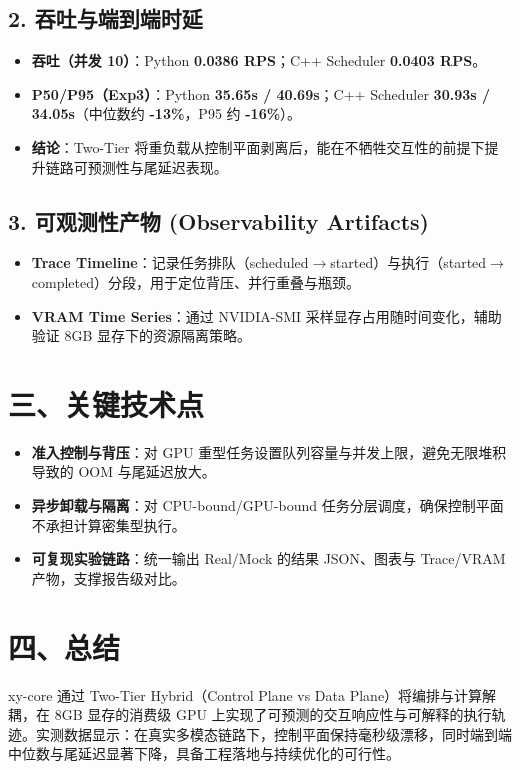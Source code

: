 \documentclass[a4paper,10pt]{ctexart}
\newenvironment{tightitemize}
{ \begin{itemize}
    \setlength{\itemsep}{0pt}
    \setlength{\parskip}{0pt}
    \setlength{\parsep}{0pt}
}
{ \end{itemize} }
\begin{document}
\subsection{2. 吞吐与端到端时延}
\begin{tightitemize}
    \item \textbf{吞吐（并发 10）}：Python \textbf{0.0386 RPS}；C++ Scheduler \textbf{0.0403 RPS}。
    \item \textbf{P50/P95（Exp3）}：Python \textbf{35.65s / 40.69s}；C++ Scheduler \textbf{30.93s / 34.05s}（中位数约 \textbf{-13\%}，P95 约 \textbf{-16\%}）。
    \item \textbf{结论}：Two-Tier 将重负载从控制平面剥离后，能在不牺牲交互性的前提下提升链路可预测性与尾延迟表现。
\end{tightitemize}

\subsection{3. 可观测性产物 (Observability Artifacts)}
\begin{tightitemize}
    \item \textbf{Trace Timeline}：记录任务排队（scheduled$\to$started）与执行（started$\to$completed）分段，用于定位背压、并行重叠与瓶颈。
    \item \textbf{VRAM Time Series}：通过 NVIDIA-SMI 采样显存占用随时间变化，辅助验证 8GB 显存下的资源隔离策略。
\end{tightitemize}

\section{三、关键技术点}
\begin{tightitemize}
    \item \textbf{准入控制与背压}：对 GPU 重型任务设置队列容量与并发上限，避免无限堆积导致的 OOM 与尾延迟放大。
    \item \textbf{异步卸载与隔离}：对 CPU-bound/GPU-bound 任务分层调度，确保控制平面不承担计算密集型执行。
    \item \textbf{可复现实验链路}：统一输出 Real/Mock 的结果 JSON、图表与 Trace/VRAM 产物，支撑报告级对比。
\end{tightitemize}

\section{四、总结}
xy-core 通过 Two-Tier Hybrid（Control Plane vs Data Plane）将编排与计算解耦，在 8GB 显存的消费级 GPU 上实现了可预测的交互响应性与可解释的执行轨迹。实测数据显示：在真实多模态链路下，控制平面保持毫秒级漂移，同时端到端中位数与尾延迟显著下降，具备工程落地与持续优化的可行性。
\end{document}

